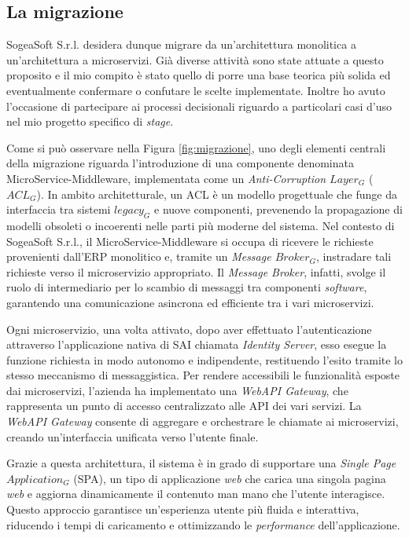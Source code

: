         \subsection{La migrazione}
        SogeaSoft S.r.l. desidera dunque migrare da un'architettura monolitica a un'architettura a microservizi. Già diverse attività sono state attuate a questo proposito e il mio compito è stato quello di porre una base teorica più solida ed eventualmente confermare o confutare le scelte implementate. Inoltre ho avuto l'occasione di partecipare ai processi decisionali riguardo a particolari casi d'uso nel mio progetto specifico di \textit{stage}. 

        \vspace{0.2 em}
        \noindent Come si può osservare nella Figura \ref{fig:migrazione}, uno degli elementi centrali della migrazione riguarda l'introduzione di una componente denominata MicroService-Middleware, implementata come un \textit{Anti-Corruption $Layer_G$} ($ACL_G$). In ambito architetturale, un ACL è un modello progettuale che funge da interfaccia tra sistemi $legacy_G$ e nuove componenti, prevenendo la propagazione di modelli obsoleti o incoerenti nelle parti più moderne del sistema. Nel contesto di SogeaSoft S.r.l., il MicroService-Middleware si occupa di ricevere le richieste provenienti dall'ERP monolitico e, tramite un \textit{Message $Broker_G$}, instradare tali richieste verso il microservizio appropriato. Il \textit{Message Broker}, infatti, svolge il ruolo di intermediario per lo scambio di messaggi tra componenti \textit{software}, garantendo una comunicazione asincrona ed efficiente tra i vari microservizi.  

        \vspace{0.2 em}
        \noindent Ogni microservizio, una volta attivato, dopo aver effettuato l'autenticazione attraverso l'applicazione nativa di SAI chiamata \textit{Identity Server}, esso esegue la funzione richiesta in modo autonomo e indipendente, restituendo l'esito tramite lo stesso meccanismo di messaggistica. Per rendere accessibili le funzionalità esposte dai microservizi, l'azienda ha implementato una \textit{WebAPI Gateway}, che rappresenta un punto di accesso centralizzato alle API dei vari servizi. La \textit{WebAPI Gateway} consente di aggregare e orchestrare le chiamate ai microservizi, creando un'interfaccia unificata verso l'utente finale.  

        \vspace{0.2 em}
        \noindent Grazie a questa architettura, il sistema è in grado di supportare una \textit{Single Page $Application_G$} (SPA), un tipo di applicazione \textit{web} che carica una singola pagina \textit{web} e aggiorna dinamicamente il contenuto man mano che l'utente interagisce. Questo approccio garantisce un'esperienza utente più fluida e interattiva, riducendo i tempi di caricamento e ottimizzando le \textit{performance} dell'applicazione.  

